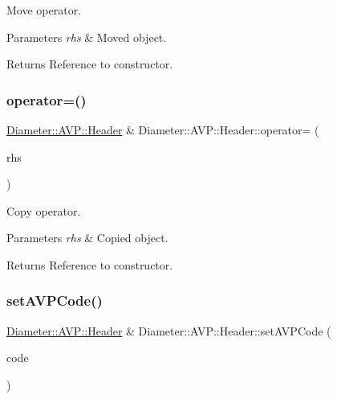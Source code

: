 Move operator. 


\begin{DoxyParams}{Parameters}
{\em rhs} & Moved object. \\
\hline
\end{DoxyParams}
\begin{DoxyReturn}{Returns}
Reference to constructor. 
\end{DoxyReturn}
\mbox{\label{classDiameter_1_1AVP_1_1Header_ab458d5befcc1e997e0cc6dc3ef7ba41c}} 
\subsubsection{\texorpdfstring{operator=()}{operator=()}\hspace{0.1cm}{\footnotesize\ttfamily [2/2]}}
{\footnotesize\ttfamily \hyperlink{classDiameter_1_1AVP_1_1Header}{Diameter\+::\+A\+V\+P\+::\+Header} \& Diameter\+::\+A\+V\+P\+::\+Header\+::operator= (\begin{DoxyParamCaption}\item[{const \hyperlink{classDiameter_1_1AVP_1_1Header}{Header} \&}]{rhs }\end{DoxyParamCaption})}



Copy operator. 


\begin{DoxyParams}{Parameters}
{\em rhs} & Copied object. \\
\hline
\end{DoxyParams}
\begin{DoxyReturn}{Returns}
Reference to constructor. 
\end{DoxyReturn}
\mbox{\label{classDiameter_1_1AVP_1_1Header_a74ba1debad513ac3eaebf760228ee9c0}} 
\subsubsection{\texorpdfstring{set\+A\+V\+P\+Code()}{setAVPCode()}}
{\footnotesize\ttfamily \hyperlink{classDiameter_1_1AVP_1_1Header}{Diameter\+::\+A\+V\+P\+::\+Header} \& Diameter\+::\+A\+V\+P\+::\+Header\+::set\+A\+V\+P\+Code (\begin{DoxyParamCaption}\item[{A\+V\+P\+Code\+Type}]{code }\end{DoxyParamCaption})}



